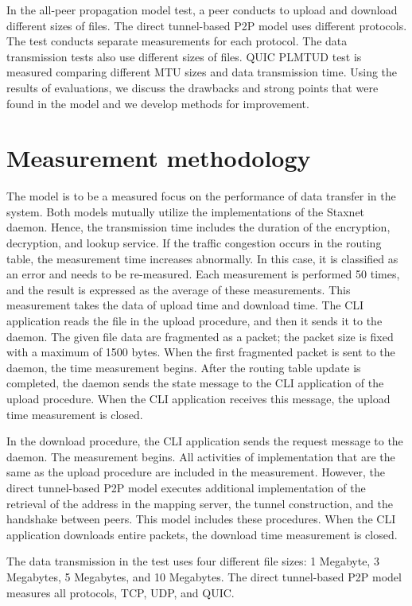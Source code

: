In the all-peer propagation model test, a peer conducts to upload and download different sizes of files. The direct tunnel-based P2P model uses different protocols. The test conducts separate measurements for each protocol. The data transmission tests also use different sizes of files. QUIC PLMTUD test is measured comparing different MTU sizes and data transmission time. Using the results of evaluations, we discuss the drawbacks and strong points that were found in the model and we develop methods for improvement.

\section{Measurement methodology}

The model is to be a measured focus on the performance of data transfer in the system. Both models mutually utilize the implementations of the Staxnet daemon. Hence, the transmission time includes the duration of the encryption, decryption, and lookup service. If the traffic congestion occurs in the routing table, the measurement time increases abnormally. In this case, it is classified as an error and needs to be re-measured. Each measurement is performed 50 times, and the result is expressed as the average of these measurements. This measurement takes the data of upload time and download time. The CLI application reads the file in the upload procedure, and then it sends it to the daemon. The given file data are fragmented as a packet; the packet size is fixed with a maximum of 1500 bytes. When the first fragmented packet is sent to the daemon, the time measurement begins. After the routing table update is completed, the daemon sends the state message to the CLI application of the upload procedure. When the CLI application receives this message, the upload time measurement is closed. 

In the download procedure, the CLI application sends the request message to the daemon. The measurement begins. All activities of implementation that are the same as the upload procedure are included in the measurement. However, the direct tunnel-based P2P model executes additional implementation of the retrieval of the address in the mapping server, the tunnel construction, and the handshake between peers. This model includes these procedures. When the CLI application downloads entire packets, the download time measurement is closed.

The data transmission in the test uses four different file sizes: 1 Megabyte, 3 Megabytes, 5 Megabytes, and 10 Megabytes. The direct tunnel-based P2P model measures all protocols, TCP, UDP, and QUIC.

